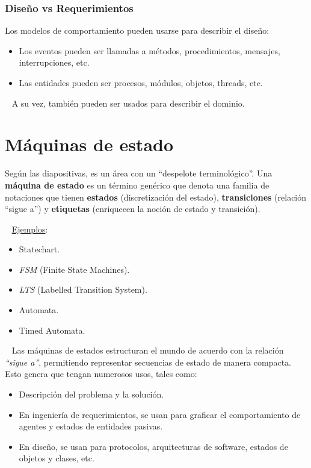 \documentclass[]{article}
\begin{document}
\subsubsection{Diseño vs Requerimientos}
Los modelos de comportamiento pueden usarse para describir el diseño:
\begin{itemize}
	\item Los eventos pueden ser llamadas a métodos, procedimientos, mensajes, interrupciones, etc.
	\item Las entidades pueden ser procesos, módulos, objetos, threads, etc.
\end{itemize}

~\newline
A su vez, también pueden ser usados para describir el dominio.

\newpage

\section{Máquinas de estado}
Según las diapositivas, es un área con un ``despelote terminológico''. Una \textbf{máquina de estado} es un término genérico que denota una familia de notaciones que tienen \textbf{estados} (discretización del estado), \textbf{transiciones} (relación ``sigue a'') y \textbf{etiquetas} (enriquecen la noción de estado y transición).

~\newline
\underline{Ejemplos}:

\begin{itemize}
	\item Statechart.
	\item \textit{FSM} (Finite State Machines).
	\item \textit{LTS} (Labelled Transition System).
	\item Automata.
	\item Timed Automata.
\end{itemize}

~\newline
Las máquinas de estados estructuran el mundo de acuerdo con la relación \textit{``sigue a''}, permitiendo representar secuencias de estado de manera compacta. Esto genera que tengan numerosos usos, tales como:
\begin{itemize}
	\item Descripción del problema y la solución.
	\item En ingeniería de requerimientos, se usan para graficar el comportamiento de agentes y estados de entidades pasivas.
	\item En diseño, se usan para protocolos, arquitecturas de software, estados de objetos y clases, etc.
\end{itemize}
\end{document}
